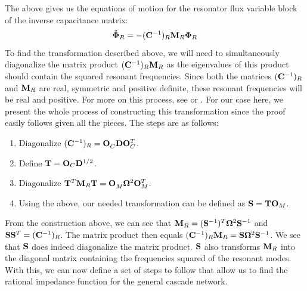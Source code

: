 The above gives us the equations of motion for the resonator flux variable block of the inverse capacitance matrix:
\begin{equation}
    \ddot{\vb{\Phi}}_R = -(\vb{C}^{-1})_R \vb{M}_R \vb{\Phi}_R
\end{equation}
To find the transformation described above, we will need to simultaneously diagonalize the matrix product $(\vb{C}^{-1})_R \vb{M}_R$ as the eigenvalues of this product should contain the squared resonant frequencies. Since both the matrices $(\vb{C}^{-1})_R$ and $\vb{M}_R$ are real, symmetric and positive definite, these resonant frequencies will be real and positive. For more on this process, see \cite[Chapter 7.6]{horn_johnson} or \cite[Appendix B.1]{cqed_lecture_notes}.
\newpage
For our case here, we present the whole process of constructing this transformation since the proof easily follows given all the pieces. The steps are as follows:
\begin{enumerate}
    \item Diagonalize $(\vb{C}^{-1})_R = \vb{O}^{\phantom{T}}_C \vb{D} \vb{O}_C^T$.
    \item Define $\vb{T} = \vb{O}_C \vb{D}^{1/2}$.
    \item Diagonalize $\vb{T}^T \vb{M}_R \vb{T} = \vb{O}^{\phantom{T}}_M \vb{\Omega}^2 \vb{O}_M^T$.
    \item Using the above, our needed transformation can be defined as $\vb{S} = \vb{T}\vb{O}_M$.
\end{enumerate}
From the construction above, we can see that $\vb{M}_R = (\vb{S}^{-1})^T \vb{\Omega}^2 \vb{S}^{-1}$ and $\vb{S}\vb{S}^T = (\vb{C}^{-1})_R$. The matrix product then equals $(\vb{C}^{-1})_R \vb{M}_R = \vb{S} \vb{\Omega}^2 \vb{S}^{-1}$. We see that $\vb{S}$ does indeed diagonalize the matrix product. $\vb{S}$ also transforms $\vb{M}_R$ into the diagonal matrix containing the frequencies squared of the resonant modes. With this, we can now define a set of steps to follow that allow us to find the rational impedance function for the general cascade network.
